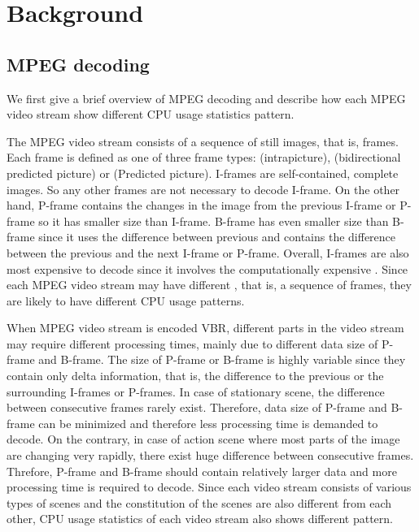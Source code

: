 \section{Background}
\label{sec:background}
\subsection{MPEG decoding}
We first give a brief overview of MPEG decoding and describe how each MPEG video stream show different CPU usage statistics pattern. 

The MPEG video stream consists of a sequence of still images, that is, frames. 
Each frame is defined as one of three frame types:  (intrapicture),  (bidirectional predicted picture) or  (Predicted picture).
I-frames are self-contained, complete images.  
So any other frames are not necessary to decode I-frame.
On the other hand, P-frame contains the changes in the image from the previous I-frame or P-frame so it has smaller size than I-frame.
B-frame has even smaller size than B-frame since it uses the difference between previous and contains the difference between the previous and the next I-frame or P-frame. 
Overall, I-frames are also most expensive to decode since it involves the computationally expensive .
Since each MPEG video stream may have different , that is, a sequence of frames, they are likely to have different CPU usage patterns. 

When MPEG video stream is encoded VBR, different parts in the video stream may require different processing times, mainly due to different data size of P-frame and B-frame. 
The size of P-frame or B-frame is highly variable since they contain only delta information, that is, the difference to the previous or the surrounding I-frames or P-frames.
In case of stationary scene, the difference between consecutive frames rarely exist. 
Therefore, data size of P-frame and B-frame can be minimized and therefore less processing time is demanded to decode. 
On the contrary, in case of action scene where most parts of the image are changing very rapidly, there exist huge difference between consecutive frames. 
Threfore, P-frame and B-frame should contain relatively larger data and more processing time is required to decode.
Since each video stream consists of various types of scenes and the constitution of the scenes are also different from each other, CPU usage statistics of each video stream also shows different pattern. 
